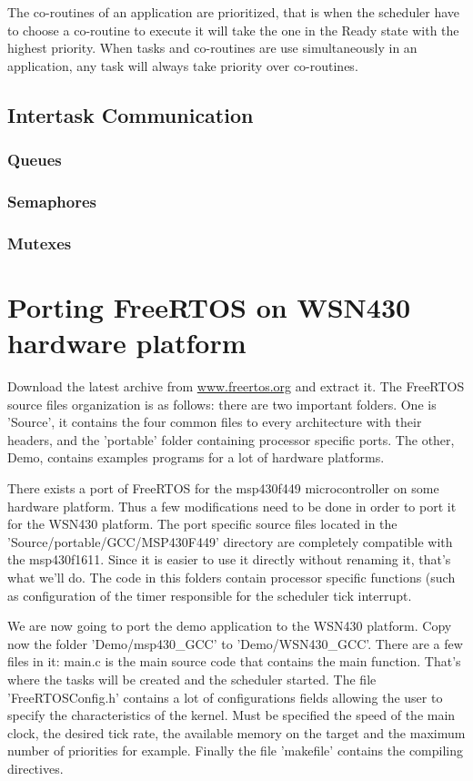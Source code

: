 \documentclass[11pt]{report}
\begin{document}
The co-routines of an application are prioritized, that is when the scheduler have to choose a co-routine to execute it will take the one in the Ready state with the highest priority. When tasks and co-routines are use simultaneously in an application, any task will always take priority over co-routines. 

\section{Intertask Communication}
\subsection{Queues}

\subsection{Semaphores}
\subsection{Mutexes}


\chapter{Porting FreeRTOS on WSN430 hardware platform}
Download the latest archive from \url{www.freertos.org} and extract it. The FreeRTOS source files organization is as follows: there are two important folders. One is 'Source', it contains the four common files to every architecture with their headers, and the 'portable' folder containing processor specific ports. The other, Demo, contains examples programs for a lot of hardware platforms.

There exists a port of FreeRTOS for the msp430f449 microcontroller on some hardware platform. Thus a few modifications need to be done in order to port it for the WSN430 platform. The port specific source files located in  the 'Source/portable/GCC/MSP430F449' directory are completely compatible with the msp430f1611. Since it is easier to use it directly without renaming it, that's what we'll do. The code in this folders contain processor specific functions (such as configuration of the timer responsible for the scheduler tick interrupt.

We are now going to port the demo application to the WSN430 platform. Copy now the folder 'Demo/msp430\_GCC' to 'Demo/WSN430\_GCC'. There are a few files in it: main.c is the main source code that contains the main function. That's where the tasks will be created and the scheduler started. The file 'FreeRTOSConfig.h' contains a lot of configurations fields allowing the user to specify the characteristics of the kernel. Must be specified the speed of the main clock, the desired tick rate, the available memory on the target and the maximum number of priorities for example. Finally the file 'makefile' contains the compiling directives.
\end{document}

